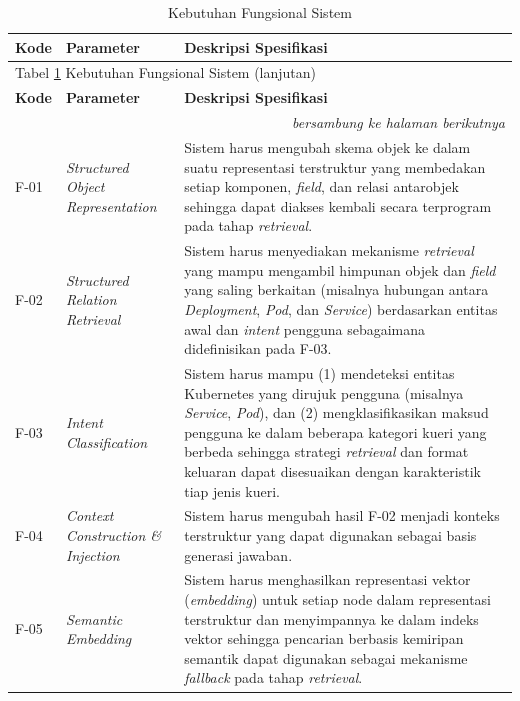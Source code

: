 ﻿\captionsetup[longtable]{justification=raggedright,singlelinecheck=false}

\begin{longtable}{ p{} p{} p{} }
\caption{Kebutuhan Fungsional Sistem}
\label{tbl:fungsional} \\
\hline
\textbf{Kode} & \textbf{Parameter} & \textbf{Deskripsi Spesifikasi} \\
\hline
\endfirsthead

\multicolumn{3}{l}{Tabel \ref{tbl:fungsional} Kebutuhan Fungsional Sistem (lanjutan)} \\
\hline
\textbf{Kode} & \textbf{Parameter} & \textbf{Deskripsi Spesifikasi} \\
\hline
\endhead

\hline
\multicolumn{3}{r}{\textit{bersambung ke halaman berikutnya}} \\
\endfoot

\hline
\endlastfoot

F-01 & \textit{Structured Object Representation} & Sistem harus mengubah skema objek ke dalam suatu representasi terstruktur yang membedakan setiap komponen, \textit{field}, dan relasi antarobjek sehingga dapat diakses kembali secara terprogram pada tahap \textit{retrieval}. \\
\hline

F-02 & \textit{Structured Relation Retrieval} & Sistem harus menyediakan mekanisme \textit{retrieval} yang mampu mengambil himpunan objek dan \textit{field} yang saling berkaitan (misalnya hubungan antara \textit{Deployment}, \textit{Pod}, dan \textit{Service}) berdasarkan entitas awal dan \textit{intent} pengguna sebagaimana didefinisikan pada F-03. \\
\hline

F-03 & \textit{Intent Classification} & Sistem harus mampu (1) mendeteksi entitas Kubernetes yang dirujuk pengguna (misalnya \textit{Service}, \textit{Pod}), dan (2) mengklasifikasikan maksud pengguna ke dalam beberapa kategori kueri yang berbeda sehingga strategi \textit{retrieval} dan format keluaran dapat disesuaikan dengan karakteristik tiap jenis kueri. \\
\hline

F-04 & \textit{Context Construction \& Injection} & Sistem harus mengubah hasil F-02 menjadi konteks terstruktur yang dapat digunakan sebagai basis generasi jawaban. \\
\hline

F-05 & \textit{Semantic Embedding} & Sistem harus menghasilkan representasi vektor (\textit{embedding}) untuk setiap node dalam representasi terstruktur dan menyimpannya ke dalam indeks vektor sehingga pencarian berbasis kemiripan semantik dapat digunakan sebagai mekanisme \textit{fallback} pada tahap \textit{retrieval}. \\
\hline


\end{longtable}
